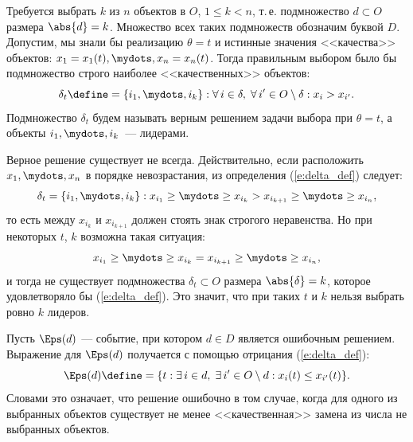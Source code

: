 Требуется выбрать $k$ из $n$ объектов в $O$, $1 \leq k < n$, т.\,е. подмножество $d \subset O$ размера $\abs{d} = k$. Множество всех таких подмножеств обозначим буквой $D$. Допустим, мы знали бы реализацию $\theta = t$ и истинные значения <<качества>> объектов: $x_1 = x_1(t), \mydots, x_n = x_n(t)$. Тогда правильным выбором было бы подмножество строго наиболее <<качественных>> объектов:
\begin{equation}
    \label{e:delta_def}
    \delta_{t} \define= \{i_1, \mydots, i_k\}: \forall\, i \in \delta,\; \forall\, i' \in O \setminus \delta: x_i > x_{i'}. 
\end{equation}
Подмножество $\delta_{t}$ будем называть верным решением задачи выбора {} при $\theta = t$, а объекты $i_1, \mydots, i_k$~--- лидерами. %

Верное решение существует не всегда. Действительно, если расположить $x_1, \mydots, x_n$ в порядке невозрастания, из определения (\ref{e:delta_def}) следует:
\begin{equation}
   \label{e:right_order_strict}
    \delta_t = \{i_1, \mydots, i_k\}: x_{i_1} \geq \mydots \geq x_{i_k} > x_{i_{k+1}} \geq \mydots \geq x_{i_n},   
\end{equation}
то есть между $x_{i_k}$ и $x_{i_{k+1}}$ должен стоять знак строгого неравенства. Но при некоторых $t$, $k$ возможна такая ситуация:
\begin{equation}
    \label{e:right_order_fail}
    x_{i_1} \geq \mydots \geq x_{i_k} = x_{i_{k+1}} \geq \mydots \geq x_{i_n},    
\end{equation}
и тогда не существует подмножества $\delta_t \subset O$ размера $\abs{\delta} = k$, которое  удовлетворяло бы (\ref{e:delta_def}). Это значит, что при таких $t$ и $k$ нельзя выбрать ровно $k$ лидеров. 

Пусть $\Eps(d)$ --- событие, при котором $d \in D$ является ошибочным решением. Выражение для $\Eps(d)$ получается с помощью отрицания (\ref{e:delta_def}):
\begin{equation}
  \label{e:Eps_d_def}
  \Eps(d) \define= \{t: \exists\, i \in d,\; \exists\, i' \in O \setminus d: x_i(t) \leq x_{i'}(t)\}.
\end{equation}
Словами это означает, что решение ошибочно в том случае, когда для одного из выбранных объектов существует не менее <<качественная>> замена из числа не выбранных объектов.

